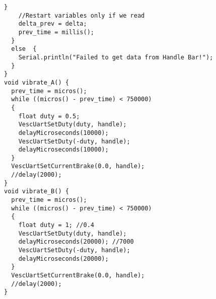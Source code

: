 \begin{lstlisting}[style=codearduino]
    }
    //Restart variables only if we read
    delta_prev = delta;
    prev_time = millis();
  }
  else  {
    Serial.println("Failed to get data from Handle Bar!");
  }
}
void vibrate_A() {
  prev_time = micros();
  while ((micros() - prev_time) < 750000)
  {
    float duty = 0.5;
    VescUartSetDuty(duty, handle);
    delayMicroseconds(10000);
    VescUartSetDuty(-duty, handle);
    delayMicroseconds(10000);
  }
  VescUartSetCurrentBrake(0.0, handle);
  //delay(2000);
}
void vibrate_B() {
  prev_time = micros();
  while ((micros() - prev_time) < 750000)
  {
    float duty = 1; //0.4
    VescUartSetDuty(duty, handle);
    delayMicroseconds(20000); //7000
    VescUartSetDuty(-duty, handle);
    delayMicroseconds(20000);
  }
  VescUartSetCurrentBrake(0.0, handle);
  //delay(2000);
}


\end{lstlisting}

\newpage
